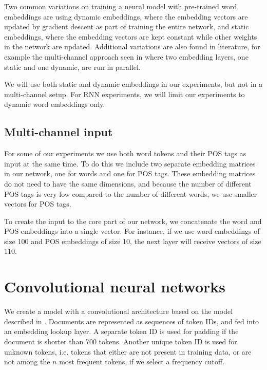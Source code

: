 Two common variations on training a neural model with pre-trained word
embeddings are using dynamic embeddings, where the embedding vectors are
updated by gradient descent as part of training the entire network, and
static embeddings, where the embedding vectors are kept constant while other
weights in the network are updated. Additional variations are also found in
literature, for example the multi-channel approach seen in
\textcite{kim2014convolutional} where two embedding layers, one static and
one dynamic, are run in parallel.

We will use both static and dynamic embeddings in our experiments, but not in
a multi-channel setup. For RNN experiments, we will limit our experiments to
dynamic word embeddings only.


\subsection{Multi-channel input}

For some of our experiments we use both word tokens and their POS tags as
input at the same time. To do this we include two separate embedding matrices
in our network, one for words and one for POS tags. These embedding matrices
do not need to have the same dimensions, and because the number of
different POS tags is very low compared to the number of different words, we
use smaller vectors for POS tags.

To create the input to the core part of our network, we concatenate the word
and POS embeddings into a single vector. For instance, if we use word
embeddings of size 100 and POS embeddings of size 10, the next layer will
receive vectors of size 110.


\section{Convolutional neural networks}

We create a model with a convolutional architecture based on the model
described in \textcite{kim2014convolutional}. Documents are represented as
sequences of token IDs, and fed into an embedding lookup layer. A separate
token ID is used for padding if the document is shorter than 700 tokens.
Another unique token ID is used for unknown tokens, i.e. tokens that either
are not present in training data, or are not among the $n$ most frequent
tokens, if we select a frequency cutoff.

